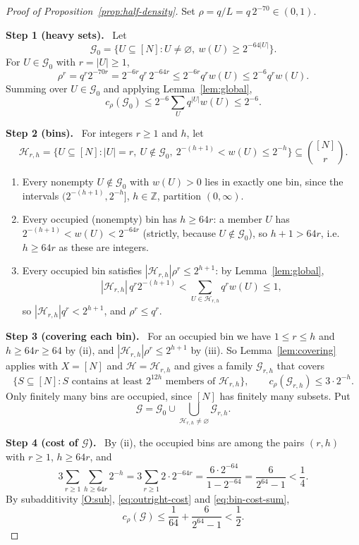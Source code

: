 \documentclass[11pt,letterpaper]{article}
\theoremstyle{definition}
\theoremstyle{remark}
\numberwithin{equation}{section}
\newcommand{\step}[1]{\par\medskip\noindent\textbf{#1}\ }
\begin{document}
\begin{proof}[Proof of Proposition~\ref{prop:half-density}]
Set $\rho=q/L=q\,2^{-70}\in(0,1)$.

\step{Step 1 (heavy sets).}
Let
\[
 \mathcal G_0=
 \{U\subseteq[N]:U\ne\varnothing,\ w(U)\ge2^{-64|U|}\}.
\]
For $U\in\mathcal G_0$ with $r=|U|\ge1$,
\[
 \rho^r=q^r2^{-70r}=2^{-6r}q^r\,2^{-64r}
 \le2^{-6r}q^r w(U)
 \le2^{-6}q^r w(U).
\]
Summing over $U\in\mathcal G_0$ and applying
Lemma~\ref{lem:global},
\begin{equation}\label{eq:outright-cost}
 c_\rho(\mathcal G_0)\le2^{-6}\sum_{U}q^{|U|}w(U)\le2^{-6}.
\end{equation}

\step{Step 2 (bins).}
For integers $r\ge1$ and $h$, let
\[
 \mathcal H_{r,h}=
 \bigl\{U\subseteq[N]:|U|=r,\ U\notin\mathcal G_0,
 \ 2^{-(h+1)}<w(U)\le2^{-h}\bigr\}\subseteq\binom{[N]}{r}.
\]
\begin{enumerate}[label=(\roman*)]
\item Every nonempty $U\notin\mathcal G_0$ with $w(U)>0$ lies in exactly
one bin, since the intervals $(2^{-(h+1)},2^{-h}]$, $h\in\mathbb Z$,
partition $(0,\infty)$.
\item Every occupied (nonempty) bin has $h\ge64r$: a member $U$ has
$2^{-(h+1)}<w(U)<2^{-64r}$ (strictly, because $U\notin\mathcal G_0$), so
$h+1>64r$, i.e.\ $h\ge64r$ as these are integers.
\item Every occupied bin satisfies $|\mathcal H_{r,h}|\rho^r\le2^{h+1}$:
by Lemma~\ref{lem:global},
\[
 |\mathcal H_{r,h}|\,q^r2^{-(h+1)}
 <\sum_{U\in\mathcal H_{r,h}}q^r w(U)\le1,
\]
so $|\mathcal H_{r,h}|q^r<2^{h+1}$, and $\rho^r\le q^r$.
\end{enumerate}

\step{Step 3 (covering each bin).}
For an occupied bin we have $1\le r\le h$ and $h\ge64r\ge64$ by (ii), and
$|\mathcal H_{r,h}|\rho^r\le2^{h+1}$ by (iii). So
Lemma~\ref{lem:covering} applies with $X=[N]$ and
$\mathcal H=\mathcal H_{r,h}$ and gives a family $\mathcal G_{r,h}$ that
covers
\[
\{S\subseteq[N]:S\text{ contains at least }2^{12h}
 \text{ members of }\mathcal H_{r,h}\},
\qquad
 c_\rho(\mathcal G_{r,h})\le3\cdot2^{-h}.
\]
Only finitely many bins are occupied, since $[N]$ has finitely many
subsets. Put
\[
 \mathcal G=\mathcal G_0\cup\bigcup_{\mathcal H_{r,h}\ne\varnothing}
 \mathcal G_{r,h}.
\]

\step{Step 4 (cost of $\mathcal G$).}
By (ii), the occupied bins are among the pairs $(r,h)$ with $r\ge1$,
$h\ge64r$, and
\begin{equation}\label{eq:bin-cost-sum}
 3\sum_{r\ge1}\sum_{h\ge64r}2^{-h}
 =3\sum_{r\ge1}2\cdot2^{-64r}
 =\frac{6\cdot2^{-64}}{1-2^{-64}}
 =\frac{6}{2^{64}-1}<\frac14 .
\end{equation}
By subadditivity \ref{O:sub}, \eqref{eq:outright-cost} and
\eqref{eq:bin-cost-sum},
\[
 c_\rho(\mathcal G)
 \le\frac1{64}+\frac{6}{2^{64}-1}<\frac12.
\]


\end{proof}
\end{document}

